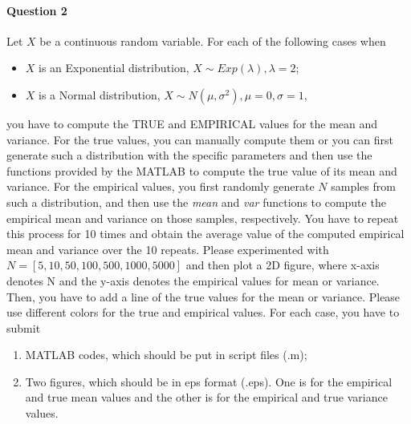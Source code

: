 \documentclass[11pt]{article} %
\begin{document}
\paragraph*{Question 2}
Let $X$ be a continuous random variable. For each of the following cases when
\begin{itemize}
\item $X$ is an Exponential distribution, $X \sim Exp(\lambda), \lambda = 2$;
\item $X$ is a Normal distribution, $X \sim N(\mu, \sigma^2), \mu=0, \sigma = 1$,
\end{itemize}
you have to compute the TRUE and EMPIRICAL values for the mean and variance. For the true values, you can manually compute them or you can first generate such a distribution with the specific parameters and then use the functions provided by the MATLAB to compute the true value of its mean and variance. For the empirical values, you first randomly generate $N$ samples from such a distribution, and then use the {\it mean} and {\it var} functions to compute the empirical mean and variance on those samples, respectively. You have to repeat this process for 10 times and obtain the average value of the computed empirical mean and variance over the 10 repeats. Please experimented with $N = [5,10,50,100,500,1000,5000]$ and then plot a 2D figure, where x-axis denotes N and the y-axis denotes the empirical values for mean or variance. Then, you have to add a line of the true values for the mean or variance. Please use different colors for the true and empirical values. 
For each case, you have to submit 
\begin{enumerate}
\item MATLAB codes, which should be put in script files (.m); 
\item Two figures, which should be in eps format (.eps). One is for the empirical and true mean values and the other is for the empirical and true variance values. 
\end{enumerate}
\end{document}
